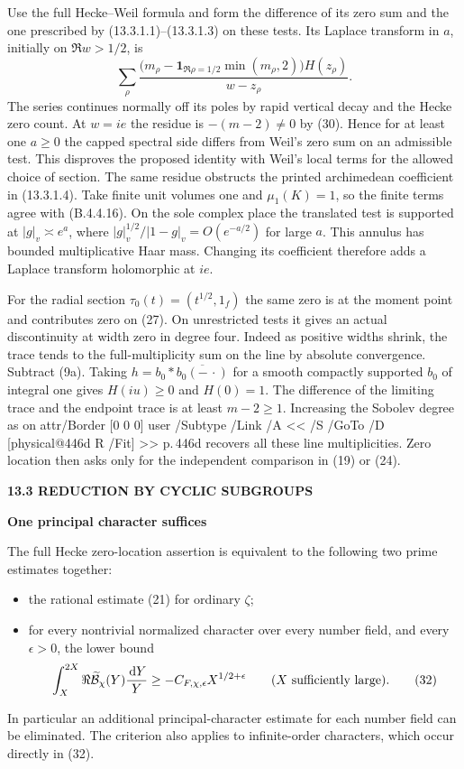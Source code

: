 \documentclass[11pt,letterpaper]{article}
\makeatletter
\newcommand{\rightmarktext}{}
\newcommand{\printfolio}{}
\newcommand{\leaf}[4]{\clearpage\gdef\printfolio{#1}\gdef\rightmarktext{#2}%
  {\small\sffamily\bfseries\color{ink}#3\par}\vspace{3pt}%
  {\LARGE\bfseries #4\par}\vspace{5pt}}
\newcommand{\dd}{\,\mathrm d}
\newcommand{\MusicPDFPageRef}[1]{\pdfpageref\csname physical@#1\endcsname\space\space 0 R}
\newcommand{\pagelink}[2]{\leavevmode\pdfstartlink attr{/Border [0 0 0]} user{%
  /Subtype /Link /A << /S /GoTo /D [\MusicPDFPageRef{#1} /Fit] >>}%
  {\color{ink}#2}\pdfendlink}
\newcommand{\pg}[1]{\pagelink{#1}{p.\,#1}}
\makeatother
\begin{document}
Use the full Hecke--Weil formula and form the difference of its zero
sum and the one prescribed by (13.3.1.1)--(13.3.1.3) on these tests.
Its Laplace transform in $a$, initially on $\Re w>1/2$, is
\[
 \sum_\rho
 \frac{\big(m_\rho-\mathbf1_{\Re\rho=1/2}\min(m_\rho,2)\big)
              H(z_\rho)}{w-z_\rho}.
 \tag{31}
\]
The series continues normally off its poles by rapid vertical decay
and the Hecke zero count. At $w=ie$ the residue is $-(m-2)\ne0$ by
(30). Hence for at least one $a\ge0$ the capped spectral side differs
from Weil's zero sum on an admissible test. This disproves the proposed
identity with Weil's local terms for the allowed choice of section.
The same residue obstructs the printed archimedean coefficient in
(13.3.1.4). Take finite unit volumes one and $\mu_1(K)=1$, so the
finite terms agree with (B.4.4.16). On the sole complex place the
translated test is supported at $|g|_v\asymp e^a$, where
$|g|_v^{1/2}/|1-g|_v=O(e^{-a/2})$ for large $a$. This annulus has
bounded multiplicative Haar mass. Changing its coefficient therefore
adds a Laplace transform holomorphic at $ie$.

For the radial section $\tau_0(t)=(t^{1/2},1_f)$ the same zero is
at the moment point and contributes zero on (27). On unrestricted
tests it gives an actual discontinuity at width zero in degree four.
Indeed as positive widths shrink, the trace tends to the
full-multiplicity sum on the line by absolute convergence. Subtract
(9a). Taking $h=b_0*\overline{b_0(-\,\cdot)}$ for a smooth compactly
supported $b_0$ of integral one gives $H(iu)\ge0$ and $H(0)=1$.
The difference of the limiting trace and the endpoint trace is at
least $m-2\ge1$. Increasing the Sobolev degree as on \pg{446d}
recovers all these line multiplicities. Zero location then asks only
for the independent comparison in (19) or (24).

\leaf{522i}{The principal components}{13.3 \quad REDUCTION BY CYCLIC SUBGROUPS}{One principal character suffices}
The full Hecke zero-location assertion is equivalent to the following
two prime estimates together:
\begin{itemize}\setlength{\itemsep}{2pt}
\item the rational estimate (21) for ordinary $\zeta$;
\item for every nontrivial normalized character over every number field,
and every $\epsilon>0$, the lower bound
\[
   \int_X^{2X}\Re\widetilde{\mathcal B}_\chi(Y)\frac{\dd Y}{Y}
                        \ge -C_{F,\chi,\epsilon}X^{1/2+\epsilon}
                        \qquad(X\ \hbox{sufficiently large}).
 \tag{32}
\]
\end{itemize}
In particular an additional principal-character estimate for each
number field can be eliminated. The criterion also applies to
infinite-order characters, which occur directly in (32).
\end{document}
